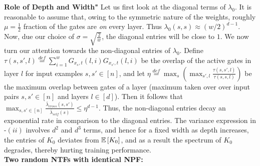 \textbf{Role of Depth and Width" } Let us first look at the diagonal terms of $\lambda_0$. It is reasonable to assume that, owing to the symmetric nature of the weights, roughly $\mu=\frac{1}{2}$ fraction of the gates are \emph{on} every layer. Thus $\lambda_0(s,s)\approx (w/2)^{d-1}$. Now, due our choice of $\sigma=\sqrt{\frac{2}{w}}$, the diagonal entries will be close to $1$. We now turn our attention towards the non-diagonal entries of $\lambda_0$. Define $\tau(s,s',l)\stackrel{def}=\sum_{i=1}^w G_{x_s,t}(l,i)G_{x_{s'},t}(l,i)$ be the overlap of the active gates in layer $l$ for input examples $s,s'\in[n]$, and  let $\eta\stackrel{def}=\max_s\left(\max_{s',l} \frac{\tau(s,s',l)}{\tau(s,s,l)}\right)$ be the maximum overlap between gates of a layer (maximum taken over over input pairs $s,s'\in[n]$ and layers $l\in [d]$).  Then it follows that $\max_{s,s'\in [n]} \frac{\bar{\lambda}_{cross}(s,s')}{\bar{\lambda}_{self}(s)}\leq \eta^{d-1}$. Thus, the non-diagonal entries decay an exponential rate in comparison to the diagonal entries. The variance expression in -$(ii)$ involves $d^2$ and $d^3$ terms, and hence for a fixed width as depth increases, the entries of $K_0$ deviates from $\mathbb{E}\left[K_0\right]$, and as a result the spectrum of $K_0$ degrades, thereby hurting training performance.\\
\textbf{Two random NTFs with identical NPF:}